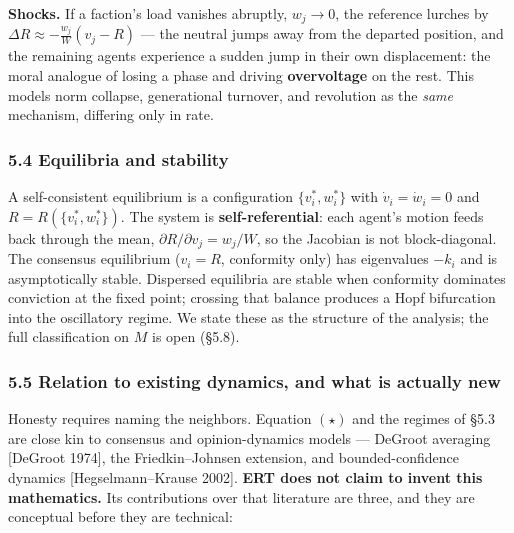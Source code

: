 \documentclass[
]{article}
\begin{document}
\textbf{Shocks.} If a faction's load vanishes abruptly, \(w_j \to 0\),
the reference lurches by \(\Delta R \approx -\tfrac{w_j}{W}(v_j - R)\)
--- the neutral jumps away from the departed position, and the remaining
agents experience a sudden jump in their own displacement: the moral
analogue of losing a phase and driving \textbf{overvoltage} on the rest.
This models norm collapse, generational turnover, and revolution as the
\emph{same} mechanism, differing only in rate.

\subsubsection{5.4 Equilibria and
stability}\label{equilibria-and-stability}

A self-consistent equilibrium is a configuration
\(\{v_i^{*}, w_i^{*}\}\) with \(\dot v_i = \dot w_i = 0\) and
\(R = R(\{v_i^{*}, w_i^{*}\})\). The system is
\textbf{self-referential}: each agent's motion feeds back through the
mean, \(\partial R/\partial v_j = w_j/W\), so the Jacobian is not
block-diagonal. The consensus equilibrium (\(v_i = R\), conformity only)
has eigenvalues \(-k_i\) and is asymptotically stable. Dispersed
equilibria are stable when conformity dominates conviction at the fixed
point; crossing that balance produces a Hopf bifurcation into the
oscillatory regime. We state these as the structure of the analysis; the
full classification on \(M\) is open (§5.8).

\subsubsection{5.5 Relation to existing dynamics, and what is actually
new}\label{relation-to-existing-dynamics-and-what-is-actually-new}

Honesty requires naming the neighbors. Equation \((\star)\) and the
regimes of §5.3 are close kin to consensus and opinion-dynamics models
--- DeGroot averaging {[}DeGroot 1974{]}, the Friedkin--Johnsen
extension, and bounded-confidence dynamics {[}Hegselmann--Krause
2002{]}. \textbf{ERT does not claim to invent this mathematics.} Its
contributions over that literature are three, and they are conceptual
before they are technical:
\end{document}
